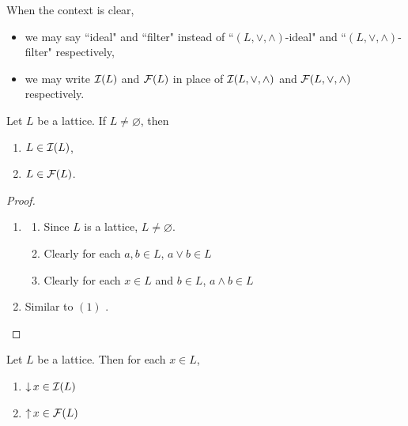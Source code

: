 \documentclass{book}
\begin{document}
	\begin{note}
		When the context is clear,
		\begin{itemize}
			\item we may say ``ideal" and ``filter" instead of ``$(L, \vee, \wedge)$-ideal" and ``$(L, \vee, \wedge)$-filter" respectively,
			\item we may write $\mathcal{I}(L)$ and $\mathcal{F}(L)$ in place of $\mathcal{I}(L, \vee, \wedge)$ and $\mathcal{F}(L, \vee, \wedge)$ respectively.
		\end{itemize}
	\end{note}
	
	\begin{ex}
		Let $L$ be a lattice. If $L \neq \varnothing$, then 
		\begin{enumerate}
			\item $L \in \mathcal{I}(L)$,
			\item $L \in \mathcal{F}(L)$.
		\end{enumerate}
	\end{ex}
	
	\begin{proof}\
		\begin{enumerate}
			\item 
			\begin{enumerate}
				\item Since $L$ is a lattice, $L \neq \varnothing$.
				\item Clearly for each $a,b \in L$, $a \vee b \in L$
				\item Clearly for each $x \in L$ and $b \in L$, $a \wedge b \in L$
			\end{enumerate}
			\item Similar to $(1)$ .
		\end{enumerate}
	\end{proof}
	
	\begin{ex}
		Let $L$ be a lattice. Then for each $x \in L$,
		\begin{enumerate}
			\item $\operatorname{\downarrow} x \in \mathcal{I}(L)$
			\item $\operatorname{\uparrow} x \in \mathcal{F}(L)$
		\end{enumerate}
	\end{ex}
	
\end{document}
